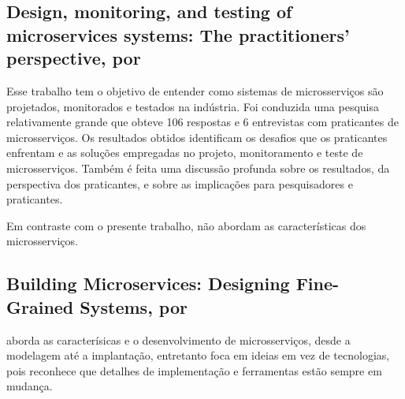 
\subsection{Design, monitoring, and testing of microservices systems: The practitioners’ perspective, por \texorpdfstring{}{Waseem et al. (2021)}}

Esse trabalho tem o objetivo de entender como sistemas de microsserviços são projetados, monitorados e testados na indústria. Foi conduzida uma pesquisa relativamente grande que obteve 106 respostas e 6 entrevistas com praticantes de microsserviços. Os resultados obtidos identificam os desafios que os praticantes enfrentam e as soluções empregadas no projeto, monitoramento e teste de microsserviços. Também é feita uma discussão profunda sobre os resultados, da perspectiva dos praticantes, e sobre as implicações para pesquisadores e praticantes.

Em contraste com o presente trabalho,  não abordam as características dos microsserviços.

\subsection{Building Microservices: Designing Fine-Grained Systems, por \texorpdfstring{}{Newman (2015)}}

 aborda as caracterísicas e o desenvolvimento de microsserviços, desde a modelagem até a implantação, entretanto foca em ideias em vez de tecnologias, pois reconhece que detalhes de implementação e ferramentas estão sempre em mudança.

